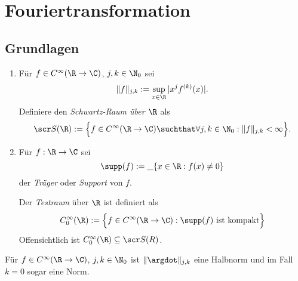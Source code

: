 
\chapter{Fouriertransformation}

\section{Grundlagen}


\begin{df} \label{4.1}
	\begin{enumerate}[1)]
		\item
			Für $f \in C^\infty(\R \to \C)$, $j,k \in \N_0$ sei
			\[
				\|f\|_{j,k} := \sup_{x\in \R} |x^j f^{(k)}(x)|.
			\]
			Definiere den \emph{Schwartz-Raum über $\R$} als
			\[
				\scr S (\R) := \Big\{ f \in C^\infty(\R \to \C) \suchthat  \forall j,k \in \N_0 : \|f\|_{j,k} < \infty \Big\}.
			\]
		\item
			Für $f : \R \to \C$ sei
			\[
				\supp(f) := \_{\{x \in \R : f(x) \neq 0\}}
			\]
			der \emph{Träger} oder \emph{Support} von $f$.

			Der \emph{Testraum} über $\R$ ist definiert als
			\[
				C_0^\infty(\R) := \Big\{f \in C^\infty(\R\to\C) : \supp(f) \text{ ist kompakt} \Big\}
			\]
			Offensichtlich ist $C_0^\infty (\R) \subset \scr S(R)$.
	\end{enumerate}
	\begin{note}
		Für $f \in C^\infty(\R \to \C)$, $j,k\in\N_0$ ist $\|\argdot\|_{j,k}$ eine Halbnorm und im Fall $k = 0$ sogar eine Norm.
	\end{note}
\end{df}

